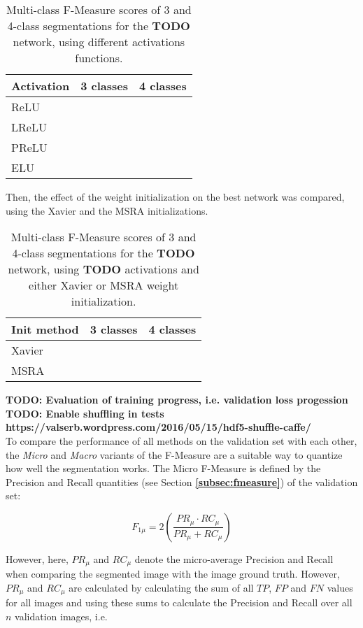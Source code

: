 \begin {table}
	\centering
	\begin {tabular}[!ht]{|l|c|c|}
		\hline
		\textbf{Activation}& \textbf{3 classes}& \textbf{4 classes}\\ \hline
		ReLU& & \\ \hline
		LReLU& & \\ \hline
		PReLU& & \\ \hline
		ELU& & \\ \hline
	\end {tabular}
\caption[]{Multi-class F-Measure scores of 3 and 4-class segmentations for the \textbf{TODO} network, using different activations functions.}
\end {table}

\noindent Then, the effect of the weight initialization on the best network was compared, using the Xavier and the MSRA initializations.

\begin {table}
	\centering
	\begin {tabular}[!ht]{|l|c|c|}
		\hline
		\textbf{Init method}& \textbf{3 classes}& \textbf{4 classes}\\ \hline
		Xavier& & \\ \hline
		MSRA& & \\ \hline
	\end {tabular}
\caption[]{Multi-class F-Measure scores of 3 and 4-class segmentations for the \textbf{TODO} network, using \textbf{TODO} activations and either Xavier or MSRA weight initialization.}
\end {table}

\textbf{TODO: Evaluation of training progress, i.e. validation loss progession}\\
\textbf{TODO: Enable shuffling in tests https://valserb.wordpress.com/2016/05/15/hdf5-shuffle-caffe/}\\


\noindent To compare the performance of all methods on the validation set with each other, the \textit{Micro} and \textit{Macro} variants of the F-Measure \cite{micromacro} are a suitable way to quantize how well the segmentation works. The Micro F-Measure is defined by the Precision and Recall quantities (see Section \textbf{\ref{subsec:fmeasure}}) of the validation set:

\[ F_{1\mu} = 2 \left ( \frac{PR_\mu \cdot RC_\mu}{PR_\mu + RC_\mu} \right ) \]

\noindent However, here, $PR_\mu$ and $RC_\mu$ denote the micro-average Precision and Recall when comparing the segmented image with the image ground truth. However, $PR_\mu$ and $RC_\mu$ are calculated by calculating the sum of all $TP$, $FP$ and $FN$ values for all images and using these sums to calculate the Precision and Recall over all $n$ validation images, i.e.

